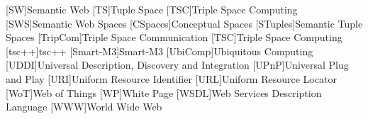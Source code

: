 \begin{acronym}
  [SW]{Semantic Web}
  [TS]{Tuple Space}
  [TSC]{Triple Space Computing} %
    [SWS]{Semantic Web Spaces}
    [CSpaces]{Conceptual Spaces}
    [STuples]{Semantic Tuple Spaces}
    [TripCom]{Triple Space Communication}
    [TSC]{Triple Space Computing}
    [tsc++]{tsc++}
    [Smart-M3]{Smart-M3}
  [UbiComp]{Ubiquitous Computing}
  [UDDI]{Universal Description, Discovery and Integration}
  [UPnP]{Universal Plug and Play}
  [URI]{Uniform Resource Identifier}
  [URL]{Uniform Resource Locator}
  [WoT]{Web of Things}
  [WP]{White Page}
  [WSDL]{Web Services Description Language}
  [WWW]{World Wide Web} %
\end{acronym}

